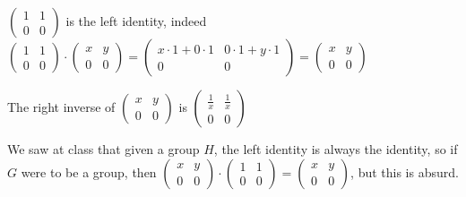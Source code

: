 \begin{cExercise}
	\begin{cPart}
		$
		\begin{pmatrix}
			1 & 1\\
			0 & 0
		\end{pmatrix}
		$ is the left identity, indeed $
		\begin{pmatrix}
			1 & 1\\
			0 & 0
		\end{pmatrix}\cdot
		\begin{pmatrix}
			x & y\\
			0 & 0
		\end{pmatrix}=
		\begin{pmatrix}
			x\cdot1+0\cdot1 & 0\cdot1+y\cdot1\\
			0 & 0
		\end{pmatrix}=
		\begin{pmatrix}
			x & y\\
			0 & 0
		\end{pmatrix}
		$
	\end{cPart}
	\begin{cPart}
		The right inverse of $\begin{pmatrix}
			x & y\\
			0 & 0
		\end{pmatrix}$ is $\begin{pmatrix}
			\frac1x & \frac1x\\
			0 & 0
		\end{pmatrix}$
	\end{cPart}
	\begin{cPart}
		We saw at class that given a group $H$, the left identity is always the identity, so if $G$ were to be a group, then $\begin{pmatrix}
			x & y\\
			0 & 0
			\end{pmatrix}\cdot \begin{pmatrix}
			1 & 1\\
			0 & 0
			\end{pmatrix}=\begin{pmatrix}
			x & y\\
			0 & 0
			\end{pmatrix}$, but this is absurd.
	\end{cPart}
\end{cExercise}
